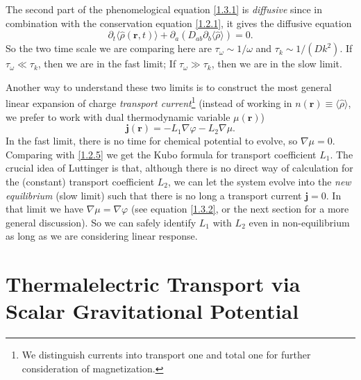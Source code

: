 \documentclass[10pt,nofootinbib,letterpaper]{revtex4}
\newcounter{Note}[section]
\newenvironment{Note}[1][]{{\par\normalfont\bfseries \underline{Note~\stepcounter{Note}\arabic{Note}.}~#1~~}}{\par}
\begin{document}
		\begin{Note}
			The second part of the phenomelogical equation \eqref{1.3.1} is \emph{diffusive} since in combination with the conservation equation \eqref{1.2.1}, it gives the diffusive equation
			\begin{equation*}
				\partial_t\langle\hat\rho(\bm{r},t)\rangle+\partial_a(D_{ab}\partial_b \langle\hat\rho\rangle)=0.
			\end{equation*}
			So the two time scale we are comparing here are $\tau_\omega\sim 1/\omega$ and $\tau_k\sim1/(Dk^2)$. If $\tau_\omega\ll\tau_k$, then we are in the fast limit; If $\tau_\omega\gg\tau_k$, then we are in the slow limit.
		\end{Note}
		\begin{Note}
			Another way to understand these two limits is to construct the most general linear expansion of charge \emph{transport current}\footnote{We distinguish currents into transport one and total one for further consideration of magnetization.} (instead of working in $n(\bm{r})\equiv\langle\hat{\rho}\rangle$, we prefer to work with dual thermodynamic variable $\mu(\bm{r})$)
			\begin{equation}\label{1.3.6}
				\bm{j}(\bm{r})=-L_1\nabla\varphi-L_2\nabla\mu.
			\end{equation}
			In the fast limit, there is no time for chemical potential to evolve, so $\nabla\mu=0$. Comparing with \eqref{1.2.5} we get the Kubo formula for transport coefficient $L_1$. {\color{red}The crucial idea of Luttinger is that, although there is no direct way of calculation for the (constant) transport coefficient $L_2$, we can let the system evolve into the \emph{new equilibrium} (slow limit) such that there is no long a transport current $\bm{j}=0$. In that limit we have $\nabla\mu=\nabla\varphi$ (see equation \eqref{1.3.2}, or the next section for a more general discussion). So we can safely identify $L_1$ with $L_2$ even in non-equilibrium as long as we are considering linear response}.
		\end{Note}



\section{Thermalelectric Transport via Scalar Gravitational Potential}
\end{document}
